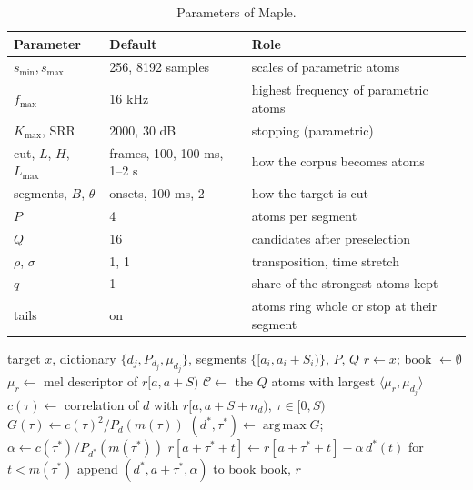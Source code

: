 \documentclass[11pt,a4paper]{article}
\newcommand{\inner}[2]{\langle #1, #2 \rangle}
\DeclareMathOperator*{\argmax}{arg\,max}
\begin{document}
\begin{table}[t]
\centering
\small
\begin{tabular}{lll}
\toprule
Parameter & Default & Role \\
\midrule
$s_{\min}, s_{\max}$ & 256, 8192 samples & scales of parametric atoms \\
$f_{\max}$ & 16 kHz & highest frequency of parametric atoms \\
$K_{\max}$, SRR & 2000, 30 dB & stopping (parametric) \\
cut, $L$, $H$, $L_{\max}$ & frames, 100, 100 ms, 1--2 s & how the corpus becomes atoms \\
segments, $B$, $\theta$ & onsets, 100 ms, 2 & how the target is cut \\
$P$ & 4 & atoms per segment \\
$Q$ & 16 & candidates after preselection \\
$\rho$, $\sigma$ & 1, 1 & transposition, time stretch \\
$q$ & 1 & share of the strongest atoms kept \\
tails & on & atoms ring whole or stop at their segment \\
\bottomrule
\end{tabular}
\caption{Parameters of Maple.}
\label{tab:maple}
\end{table}

\begin{algorithm}[t]
\caption{Matching pursuit with a sampled dictionary}
\label{alg:soundmp}
\begin{algorithmic}[1]
\Require target $x$, dictionary $\{d_j, P_{d_j}, \mu_{d_j}\}$, segments $\{[a_i, a_i+S_i)\}$, $P$, $Q$
\State $r \gets x$; book $\gets \emptyset$
\For{each segment $[a, a+S)$}
    \State $\mu_r \gets$ mel descriptor of $r[a, a+S)$
    \State $\mathcal{C} \gets$ the $Q$ atoms with largest $\inner{\mu_r}{\mu_{d_j}}$
      \State $c(\tau) \gets$ correlation of $d$ with $r[a, a+S+n_d)$, $\tau \in [0, S)$ 
      \State $G(\tau) \gets c(\tau)^2 / P_d(m(\tau))$
    \EndFor
    \State $(d^*, \tau^*) \gets \argmax G$; $\alpha \gets c(\tau^*) / P_{d^*}(m(\tau^*))$
    \State $r[a+\tau^* + t] \gets r[a+\tau^*+t] - \alpha\, d^*(t)$ for $t < m(\tau^*)$
    \State append $(d^*, a+\tau^*, \alpha)$ to book
  \EndFor
\EndFor
\State \Return book, $r$
\end{algorithmic}
\end{algorithm}

\end{document}
